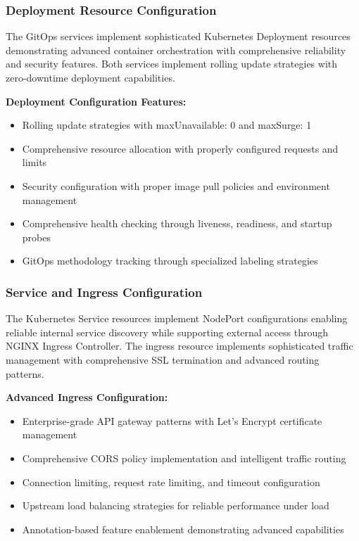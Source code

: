 \subsubsection{Deployment Resource Configuration}

The GitOps services implement sophisticated Kubernetes Deployment resources demonstrating advanced container orchestration with comprehensive reliability and security features. Both services implement rolling update strategies with zero-downtime deployment capabilities.

\textbf{Deployment Configuration Features:}
\begin{itemize}
\item Rolling update strategies with maxUnavailable: 0 and maxSurge: 1
\item Comprehensive resource allocation with properly configured requests and limits
\item Security configuration with proper image pull policies and environment management
\item Comprehensive health checking through liveness, readiness, and startup probes
\item GitOps methodology tracking through specialized labeling strategies
\end{itemize}

\subsubsection{Service and Ingress Configuration}

The Kubernetes Service resources implement NodePort configurations enabling reliable internal service discovery while supporting external access through NGINX Ingress Controller. The ingress resource implements sophisticated traffic management with comprehensive SSL termination and advanced routing patterns.

\textbf{Advanced Ingress Configuration:}
\begin{itemize}
\item Enterprise-grade API gateway patterns with Let's Encrypt certificate management
\item Comprehensive CORS policy implementation and intelligent traffic routing
\item Connection limiting, request rate limiting, and timeout configuration
\item Upstream load balancing strategies for reliable performance under load
\item Annotation-based feature enablement demonstrating advanced capabilities
\end{itemize}

